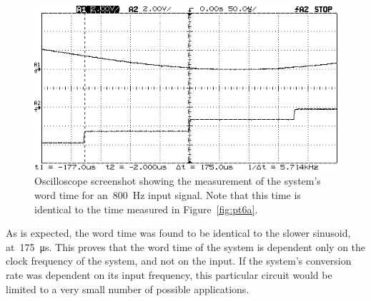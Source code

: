 \begin{figure}[H]
	\centering
	\includegraphics[width=.6\textwidth]{img/shot/pt6b_wordtime.png}
	\parbox{.6\textwidth}{
	\caption[Word Time Measurement --- \SI{800}{\hertz} Sinusoid]{Oscilloscope screenshot showing the measurement of the system's word time for an~\SI{800}{\hertz} input signal.  Note that this time is identical to the time measured in Figure~\ref{fig:pt6a}.}
	\label{fig:pt6b}}
\end{figure}
%
As is expected, the word time was found to be identical to the slower sinusoid, at~\SI{175}{\micro\second}.  This proves that the word time of the system is dependent only on the clock frequency of the system, and not on the input.  If the system's conversion rate was dependent on its input frequency, this particular circuit would be limited to a very small number of possible applications.


